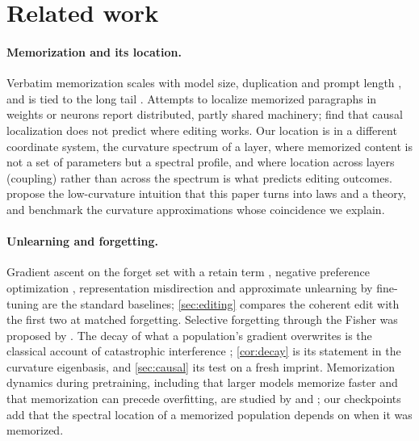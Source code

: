 \documentclass{article}
\theoremstyle{definition}\newtheorem{law}{Empirical law}
\begin{document}
\section{Related work}

\paragraph{Memorization and its location.} Verbatim memorization scales with model size, duplication and prompt length \citep{carlini2023quantifying,nasr2023scalable}, and is tied to the long tail \citep{feldman2020does,feldman2020neural}. Attempts to localize memorized paragraphs in weights or neurons \citep{stoehr2024localizing,chang2024localization,huang2024demystifying} report distributed, partly shared machinery; \citet{hase2023does} find that causal localization does not predict where editing works. Our location is in a different coordinate system, the curvature spectrum of a layer, where memorized content is not a set of parameters but a spectral profile, and where location across layers (coupling) rather than across the spectrum is what predicts editing outcomes. \citet{goodfire2025memorization} propose the low-curvature intuition that this paper turns into laws and a theory, and \citet{habo2026} benchmark the curvature approximations whose coincidence we explain.

\paragraph{Unlearning and forgetting.} Gradient ascent on the forget set with a retain term \citep{jang2023knowledge}, negative preference optimization \citep{zhang2024negative}, representation misdirection \citep{li2024wmdp} and approximate unlearning by fine-tuning \citep{eldan2023whos,maini2024tofu} are the standard baselines; \cref{sec:editing} compares the coherent edit with the first two at matched forgetting. Selective forgetting through the Fisher was proposed by \citet{golatkar2020eternal}. The decay of what a population's gradient overwrites is the classical account of catastrophic interference \citep{mccloskey1989catastrophic,kirkpatrick2017overcoming,ramasesh2021anatomy}; \cref{cor:decay} is its statement in the curvature eigenbasis, and \cref{sec:causal} its test on a fresh imprint. Memorization dynamics during pretraining, including that larger models memorize faster and that memorization can precede overfitting, are studied by \citet{tirumala2022memorization} and \citet{biderman2023emergent}; our checkpoints add that the spectral location of a memorized population depends on when it was memorized.
\end{document}
